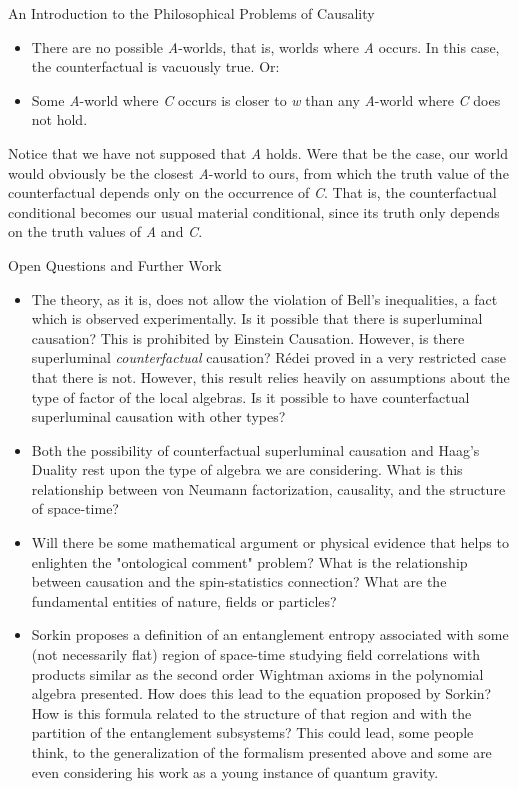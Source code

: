 \documentclass[12pt]{article}
\begin{document}
\begin{section}{An Introduction to the Philosophical Problems of Causality}
\begin{itemize}
\item There are no possible \textit{A}-worlds, that is, worlds where \textit{A} occurs. In this case, the counterfactual is vacuously true. Or:
\item Some \textit{A}-world where \textit{C} occurs is closer to \textit{w} than any \textit{A}-world where \textit{C} does not hold.
\end{itemize}

Notice that we have not supposed that \textit{A} holds. Were that be the case, our world would obviously be the closest \textit{A}-world to ours, from which the truth value of the counterfactual depends only on the occurrence of \textit{C}. That is, the counterfactual conditional becomes our usual material conditional, since its truth only depends on the truth values of \textit{A} and \textit{C}.

\end{section}

\begin{section}{Open Questions and Further Work}

\begin{itemize}
\item The theory, as it is, does not allow the violation of Bell's inequalities, a fact which is observed experimentally. Is it possible that there is superluminal causation? This is prohibited by Einstein Causation. However, is there superluminal \textit{counterfactual} causation? Rédei \cite{redei_is_1996} proved in a very restricted case that there is not. However, this result relies heavily on assumptions about the type of factor of the local algebras. Is it possible to have counterfactual superluminal causation with other types?
\item Both the possibility of counterfactual superluminal causation and Haag's Duality rest upon the type of algebra we are considering. What is this relationship between von Neumann factorization, causality, and the structure of space-time?
\item Will there be some mathematical argument or physical evidence that helps to enlighten the "ontological comment" problem? What is the relationship between causation and the spin-statistics connection? What are the fundamental entities of nature, fields or particles?
\item Sorkin proposes a definition of an entanglement entropy associated with some (not necessarily flat) region of space-time \cite{sorkin_expressing_2012} studying field correlations with products similar as the second order Wightman axioms in the polynomial algebra presented. How does this lead to the equation proposed by Sorkin? How is this formula related to the structure of that region and with the partition of the entanglement subsystems? This could lead, some people think, to the generalization of the formalism presented above and some are even considering his work as a young instance of quantum gravity.
\end{itemize}

\end{section}



\end{document}
